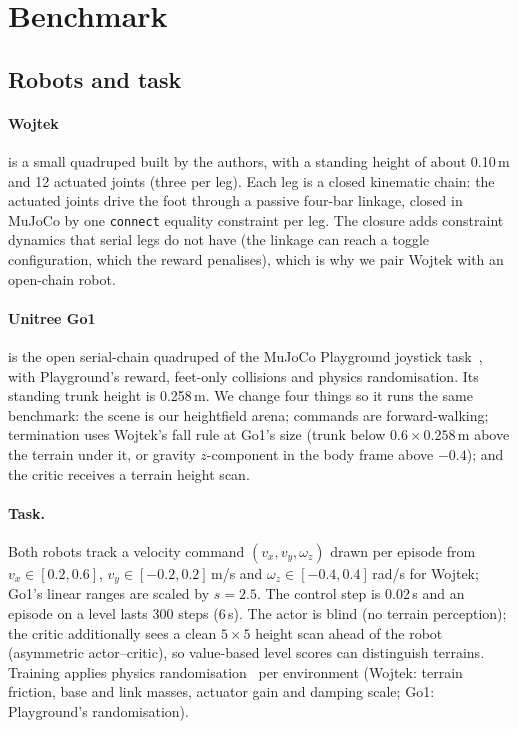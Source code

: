 \section{Benchmark}
\label{sec:benchmark}

\subsection{Robots and task}
\label{sec:robots}

\paragraph{Wojtek} is a small quadruped built by the authors, with a
standing height of about 0.10\,m and 12 actuated joints (three per leg).
Each leg is a closed kinematic chain: the actuated joints drive the foot
through a passive four-bar linkage, closed in MuJoCo by one
\texttt{connect} equality constraint per leg. The closure adds constraint
dynamics that serial legs do not have (the linkage can reach a toggle
configuration, which the reward penalises), which is why we pair Wojtek
with an open-chain robot.

\paragraph{Unitree Go1} is the open serial-chain quadruped of the MuJoCo
Playground joystick task~\citep{zakka2025playground}, with Playground's
reward, feet-only collisions and physics randomisation. Its standing trunk
height is 0.258\,m. We change four things so it runs the same benchmark:
the scene is our heightfield arena; commands are forward-walking;
termination uses Wojtek's fall rule at Go1's size (trunk below
$0.6\times0.258$\,m above the terrain under it, or gravity $z$-component in
the body frame above $-0.4$); and the critic receives a terrain height scan.

\paragraph{Task.}
Both robots track a velocity command
$(v_x, v_y, \omega_z)$ drawn per episode from
$v_x\in[0.2,0.6]$, $v_y\in[-0.2,0.2]$\,m/s and
$\omega_z\in[-0.4,0.4]$\,rad/s for Wojtek; Go1's linear ranges are scaled
by $s=2.5$. The control step is 0.02\,s and an episode on a level lasts
300 steps (6\,s). The actor is blind (no terrain perception); the
critic additionally sees a clean $5\times5$ height scan ahead of the robot
(asymmetric actor--critic), so value-based level scores can distinguish
terrains. Training applies physics randomisation~\citep{tobin2017domain}
per environment (Wojtek: terrain friction, base and link masses,
actuator gain and damping scale; Go1: Playground's randomisation).

